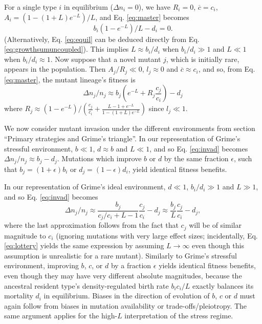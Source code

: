 \documentclass[11pt]{article}
\begin{document}
For a single type $i$ in equilibrium ($\Delta n_i = 0$), we have $R_i=0$, $\overline{c}=c_i$, $A_i=(1-(1+L)e^{-L})/L$, and Eq. \eqref{eq:master} becomes
\begin{equation}
b_i(1-e^{-L})/L-d_i=0.\label{eq:equil}
\end{equation}
(Alternatively, Eq. \eqref{eq:equil} can be deduced directly from Eq. \eqref{eq:growthsumuncoupled}). This implies $L\approx b_i/d_i$ when $b_i/d_i\gg 1$ and $L\ll 1$ when $b_i/d_i\approx 1$. Now suppose that a novel mutant $j$, which is initially rare, appears in the population. Then $A_j/R_j\ll 0$, $l_j\approx 0$ and $\overline{c}\approx c_i$, and so, from Eq. \eqref{eq:master}, the mutant lineage's fitness is
\begin{equation}
\Delta n_j/n_j \approx b_j \left(e^{-L}+R_j\frac{c_j}{c_i}\right)-d_j \label{eq:invad}
\end{equation}
where $R_j\approx (1-e^{-L})/\left(\frac{c_j}{c_i}+\frac{L-1+e^{-L}}{1-(1+L)e^{-L}}\right)$ since $l_j\ll 1$.

We now consider mutant invasion under the different environments from section ``Primary strategies and Grime's triangle''. In our representation of Grime's stressful environment, $b\ll 1$, $d\approx b$ and $L\ll 1$, and so Eq. \eqref{eq:invad} becomes $\Delta n_j/n_j \approx b_j-d_j$. Mutations which improve $b$ or $d$ by the same fraction $\epsilon$, such that $b_j = (1+ \epsilon)b_i$ or $d_j = (1- \epsilon)d_i$,  yield identical fitness benefits. 

In our representation of Grime's ideal environment, $d\ll 1$, $b_i/d_i \gg 1$ and $L\gg 1$, and so Eq. \eqref{eq:invad} becomes 
\begin{equation}
\Delta n_j/n_j \approx \frac{b_j}{c_j/c_i + L-1}\frac{c_j}{c_i}-d_j\approx \frac{b_j}{L}\frac{c_j}{c_i}-d_j, \label{eq:highLinvad}
\end{equation}
where the last approximation follows from the fact that $c_j$ will be of similar magnitude to $c_i$ (ignoring mutations with very large effect sizes; incidentally, Eq. \eqref{eq:lottery} yields the same expression by assuming $L\rightarrow \infty$ even though this assumption is unrealistic for a rare mutant). Similarly to Grime's stressful environment, improving $b$, $c$, or $d$ by a fraction $\epsilon$ yields identical fitness benefits, even though they may have very different absolute magnitudes, because the ancestral resident type's density-regulated birth rate $b_i c_i/L$ exactly balances its mortality $d_i$ in equilibrium. Biases in the direction of evolution of $b$, $c$ or $d$ must again follow from biases in mutation availability or trade-offs/pleiotropy. The same argument applies for the high-$L$ interpretation of the stress regime. 
\end{document}
